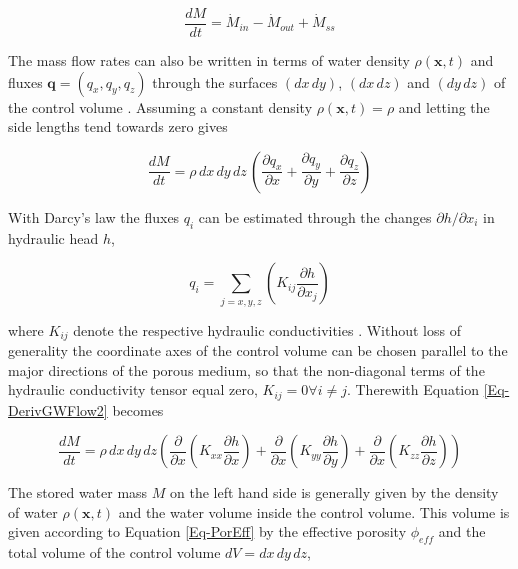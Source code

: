 \begin{equation}
    \label{Eq-DerivGWFlow1}
    \frac{dM}{dt} = \dot{M}_{in} - \dot{M}_{out} + \dot{M}_{ss}
\end{equation}

The mass flow rates can also be written in terms of water density $\rho(\bm{x},t)$ and fluxes $\bm{q} = (q_x,q_y,q_z)$ through the surfaces $(dx \, dy)$, $(dx \, dz)$ and $(dy \, dz)$ of the control volume \parencite{Mays.2005}. 
Assuming a constant density $\rho(\bm{x},t) = \rho$ and letting the side lengths tend towards zero gives

\begin{equation}
    \label{Eq-DerivGWFlow2}
    \frac{dM}{dt} = \rho \, dx \, dy \, dz \, \left( \frac{\partial q_x}{\partial x} + \frac{\partial q_y}{\partial y} + \frac{\partial q_z}{\partial z} \right)
\end{equation}

With Darcy's law the fluxes $q_i$ can be estimated through the changes $\partial h / \partial x_i$ in hydraulic head $h$,

\begin{equation}
    \label{Eq-DerivGWFlow3}
    q_i = \sum_{j=x,y,z} \left( K_{ij} \frac{\partial h}{\partial x_j} \right)
\end{equation}

\noindent where $K_{ij}$ denote the respective hydraulic conductivities \parencite{Mays.2005}. 
Without loss of generality the coordinate axes of the control volume can be chosen parallel to the major directions of the porous medium, so that the non-diagonal terms of the hydraulic conductivity tensor equal zero, $K_{ij} = 0 \forall i \neq j$. 
Therewith Equation \eqref{Eq-DerivGWFlow2} becomes

\begin{equation}
    \label{Eq-DerivGWFlow4}
    \frac{dM}{dt} = \rho \, dx \, dy \, dz \left( \frac{\partial}{\partial x} \left( K_{xx} \frac{\partial h}{\partial x} \right) + \frac{\partial}{\partial x} \left( K_{yy} \frac{\partial h}{\partial y} \right) + \frac{\partial}{\partial x} \left( K_{zz} \frac{\partial h}{\partial z} \right) \right)
\end{equation}

The stored water mass $M$ on the left hand side is generally given by the density of water $\rho(\bm{x},t)$ and the water volume inside the control volume. 
This volume is given according to Equation \eqref{Eq-PorEff} by the effective porosity $\phi_{eff}$ and the total volume of the control volume $dV = dx \, dy \, dz$,

